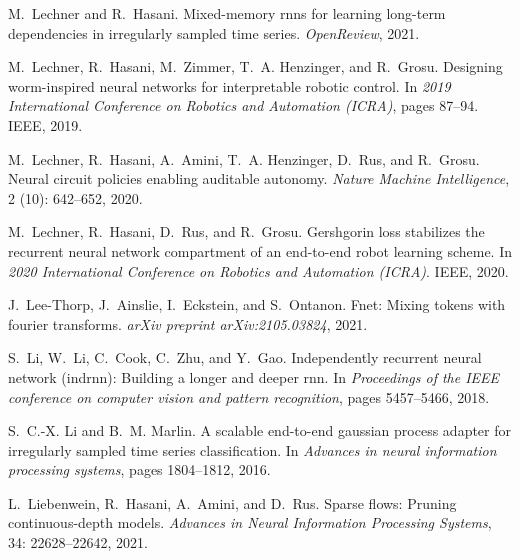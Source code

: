\documentclass{MITcsail}
\begin{document}
\begin{thebibliography}{96}
M.~Lechner and R.~Hasani.
\newblock Mixed-memory rnns for learning long-term dependencies in irregularly
  sampled time series.
\newblock \emph{OpenReview}, 2021.

M.~Lechner, R.~Hasani, M.~Zimmer, T.~A. Henzinger, and R.~Grosu.
\newblock Designing worm-inspired neural networks for interpretable robotic
  control.
\newblock In \emph{2019 International Conference on Robotics and Automation
  (ICRA)}, pages 87--94. IEEE, 2019.

M.~Lechner, R.~Hasani, A.~Amini, T.~A. Henzinger, D.~Rus, and R.~Grosu.
\newblock Neural circuit policies enabling auditable autonomy.
\newblock \emph{Nature Machine Intelligence}, 2 (10):
  642--652, 2020{}.

M.~Lechner, R.~Hasani, D.~Rus, and R.~Grosu.
\newblock Gershgorin loss stabilizes the recurrent neural network compartment
  of an end-to-end robot learning scheme.
\newblock In \emph{2020 International Conference on Robotics and Automation
  (ICRA)}. IEEE, 2020{}.

J.~Lee-Thorp, J.~Ainslie, I.~Eckstein, and S.~Ontanon.
\newblock Fnet: Mixing tokens with fourier transforms.
\newblock \emph{arXiv preprint arXiv:2105.03824}, 2021.

S.~Li, W.~Li, C.~Cook, C.~Zhu, and Y.~Gao.
\newblock Independently recurrent neural network (indrnn): Building a longer
  and deeper rnn.
\newblock In \emph{Proceedings of the IEEE conference on computer vision and
  pattern recognition}, pages 5457--5466, 2018.

S.~C.-X. Li and B.~M. Marlin.
\newblock A scalable end-to-end gaussian process adapter for irregularly
  sampled time series classification.
\newblock In \emph{Advances in neural information processing systems}, pages
  1804--1812, 2016.

L.~Liebenwein, R.~Hasani, A.~Amini, and D.~Rus.
\newblock Sparse flows: Pruning continuous-depth models.
\newblock \emph{Advances in Neural Information Processing Systems},
  34: 22628--22642, 2021.


\end{thebibliography}
\end{document}
